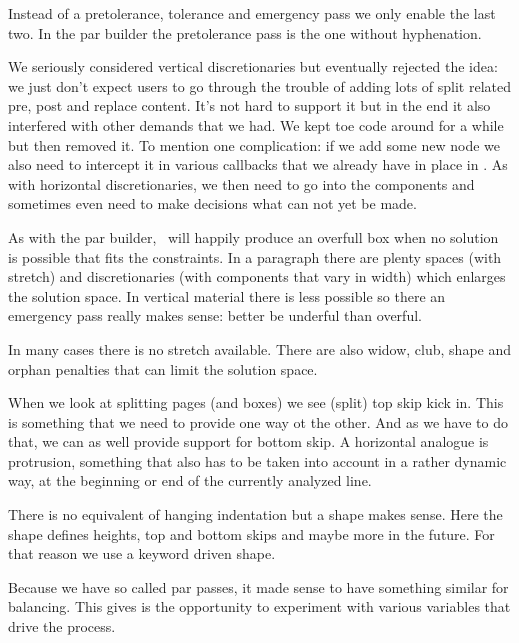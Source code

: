 \startitemize

\startitem
    Instead of a pretolerance, tolerance and emergency pass we only enable the
    last two. In the par builder the pretolerance pass is the one without
    hyphenation.
\stopitem

\startitem
    We seriously considered vertical discretionaries but eventually rejected the
    idea: we just don't expect users to go through the trouble of adding lots of
    split related pre, post and replace content. It's not hard to support it but
    in the end it also interfered with other demands that we had. We kept toe
    code around for a while but then removed it. To mention one complication: if
    we add some new node we also need to intercept it in various callbacks that
    we already have in place in \CONTEXT. As with horizontal discretionaries, we
    then need to go into the components and sometimes even need to make decisions
    what can not yet be made.
\stopitem

\startitem
    As with the par builder, \TEX\ will happily produce an overfull box when no
    solution is possible that fits the constraints. In a paragraph there are
    plenty spaces (with stretch) and discretionaries (with components that vary
    in width) which enlarges the solution space. In vertical material there is
    less possible so there an emergency pass really makes sense: better be
    underful than overful.
\stopitem

\startitem
    In many cases there is no stretch available. There are also widow, club,
    shape and orphan penalties that can limit the solution space.
\stopitem

\startitem
    When we look at splitting pages (and boxes) we see (split) top skip kick in.
    This is something that we need to provide one way ot the other. And as we
    have to do that, we can as well provide support for bottom skip. A horizontal
    analogue is protrusion, something that also has to be taken into account in a
    rather dynamic way, at the beginning or end of the currently analyzed line.
\stopitem

\startitem
    There is no equivalent of hanging indentation but a shape makes sense. Here
    the shape defines heights, top and bottom skips and maybe more in the future.
    For that reason we use a keyword driven shape.
\stopitem

\startitem
    Because we have so called par passes, it made sense to have something similar
    for balancing. This gives is the opportunity to experiment with various
    variables that drive the process.
\stopitem

